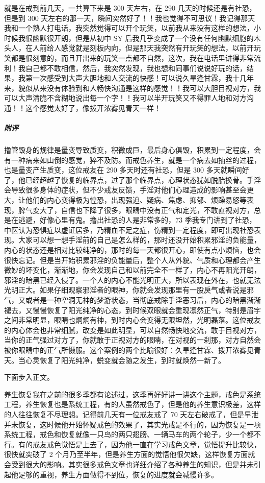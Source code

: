\begin{case}
    就是在戒到前几天，一共算下来是 300 天左右，在 290 几天的时候还是有社恐，但是到 300 天左右的那一天，瞬间突然好了！！我也觉得不可思议！我记得那天我和一个熟人打电话，我突然觉得可以开个玩笑，以前我从来没有这样的想法，小时候我很幽默很开朗，但是从初中 SY 后我几乎变成了一个没有任何幽默细胞的木头人，在人前给人感觉就是刻板内向，但是那天我突然有开玩笑的想法，以前开玩笑都是很刻意的，而且开出来的玩笑一点都不自然，这次，我在电话里讲得非常流利！我自己都不敢相信，然后，我突然发现，我也想和同事们说说好玩的话，结果，我第一次感受到大声大胆地和人交流的快感！可以说久旱逢甘霖，我十几年来，貌似从来没有体验到和人畅快沟通是这样的感觉！！我可以大胆目视对方，我可以大声清脆不含糊地说出每一个字！！我可以半开玩笑又不得罪人地和对方沟通！！这个感觉太好了，像拨开浓雾见青天一样！
    \subparagraph{附评} 撸管毁身的规律是量变导致质变，积微成巨，最后身心俱毁，积累到一定程度，会有一种病来如山倒的感觉，猝不及防。而戒色养生，就是一个病去如抽丝的过程，也是量变产生质变，这位戒友在 290 多天时还有社恐，但是 300 多天就瞬间好了，他已经超越了恢复的临界点，过了那个临界点，心理状态犹如脱胎换骨。手淫会导致很多身体的症状，但不少戒友反馈，手淫对他们心理造成的影响甚至会更大，让他们的内心变得极为惶恐，出现强迫、疑病、焦虑、抑郁、烦躁易怒等表现，脾气变大了，自信也下降了很多，眼睛中没有正气和定光，不敢直视对方，总是在逃避，好像心里有鬼。撸出社恐的人是非常多的，73 季我专门讲到了社恐，中医认为恐惧症以虚证居多，乃精血不足之症，伤精到一定程度，即可出现社恐表现。大家可以想一想手淫前的自己是怎么样的，那时还没开始积累邪淫的负能量，内心的状态还是相对比较纯净的，那时的每一天都很开心，即使有点小烦恼，也会很快忘记。但是当开始积累邪淫的负能量后，整个人从外貌、气质和心理都会产生微妙的坏变化，渐渐地，你会发现自己和以前完全不一样了，内心不再阳光开朗，邪淫的暗黑已经入侵了。一个人的内心不能光明正大，所以表现在外在，也就无法光明正大。如果仔细观察邪淫者的眼神，你就会发现那里有一股戾气或者说是邪气，又或者是一种空洞无神的梦游状态，当彻底戒除手淫恶习后，内心的暗黑渐渐褪去，又慢慢恢复了阳光纯净的心态，到时候双眼就会重现凛然正气，特别是眉宇之间非常明显，眼睛也炯炯有神，到时内心会变得无限坦然，光明磊落。这位戒友的内心体会也非常细腻，改变是如此明显，可以自然畅快地交流，敢于目视对方，当你的正气强过对方了，你就敢于正视对方的眼睛，在对视的一刹那，对方自然会被你眼睛中的正气所慑服。这个案例的两个比喻很好：久旱逢甘霖、拨开浓雾见青天。当心灵恢复了阳光纯净，蜕变就会随之发生，到时就焕然一新了。
\end{case}

下面步入正文。

养生恢复我在之前的很多季都有论述过，这季再好好讲一讲这个主题，戒色是系统工程，养生恢复也是系统工程，有的人虽然戒色了，但是他的养生意识极差，这样的人往往恢复不尽理想。记得前几天有一位戒友戒了 70 天左右破戒了，但是早泄并未恢复，这时候他开始怀疑戒色的效果了，其实光戒是不行的，因为恢复是一项系统工程，戒色和恢复就像一只鸟的两只翅膀、一辆马车的两个轮子，少一个都不行。有的戒友戒色觉悟是上去了，因为他一直在学习戒色文章，觉悟提升比较快，很快就突破了 2 个月乃至半年，但是养生方面的觉悟他很欠缺，这样恢复方面就会受到很大的影响。其实很多戒色文章也详细介绍了各种养生的知识，但是并未引起他足够的重视，养生方面做得不到位，恢复的进度就会减慢许多。


